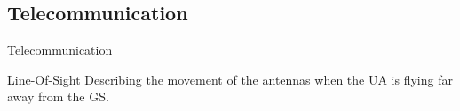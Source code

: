 \subsection{Telecommunication}


\begin{frame}{Telecommunication}{}

   \begin{block}{Line-Of-Sight}
      Describing the movement of the antennas when the UA is flying far away from the GS. 
    \end{block}

  \begin{figure}[H]
    \centerline{
    }
  \end{figure}

\end{frame}

